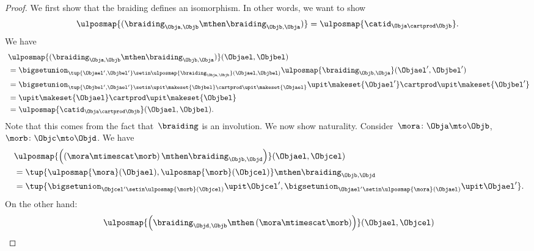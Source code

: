 \begin{proof}
    We first show that the braiding defines an isomorphism.
    In other words, we want to show
    \begin{equation}
        \ulposmap{(\braiding_{\Obja,\Objb}\mthen \braiding_{\Objb,\Obja})}=\ulposmap{\catid_{\Obja \cartprod \Objb}}.
    \end{equation}
    We have
    \begin{equation}
        \begin{aligned}
            ~ & \ulposmap{(\braiding_{\Obja,\Objb}\mthen \braiding_{\Objb,\Obja})}(\Objael,\Objbel) \\
              & =\bigsetunion_{\tup{\Objael',\Objbel'}\setin \ulposmap{\braiding_{\Obja,\Objb}}(\Objael,\Objbel)}\ulposmap{\braiding_{\Objb,\Obja}}(\Objael',\Objbel') \\
              & =\bigsetunion_{\tup{\Objbel',\Objael'}\setin \upit\makeset{\Objbel}\cartprod \upit\makeset{\Objael}}\upit\makeset{ \Objael'}\cartprod \upit\makeset{ \Objbel'} \\
              & =\upit\makeset{\Objael} \cartprod \upit\makeset{\Objbel} \\
              & =\ulposmap{\catid_{\Obja\cartprod \Objb}}(\Objael,\Objbel).
        \end{aligned}
    \end{equation}
    Note that this comes from the fact that~$\braiding$ is an involution.
    We now show naturality.
    Consider~$\mora \colon \Obja \mto \Objb$,~$\morb\colon \Objc \mto \Objd$.
    We have
    \begin{equation}
        \label{eq:braid-upos-natural-a}
        \begin{aligned}
            ~ & \ulposmap{\left(\left( \mora \mtimescat \morb\right)\mthen \braiding_{ \Objb, \Objd}\right)}(\Objael,\Objcel) \\
              & = \tup{\ulposmap{\mora}(\Objael),\ulposmap{\morb}(\Objcel)}\mthen \braiding_{ \Objb, \Objd} \\
              & =\tup{\bigsetunion_{\Objcel'\setin \ulposmap{\morb}(\Objcel)}\upit \Objcel',\bigsetunion_{\Objael'\setin \ulposmap{\mora}(\Objael)}\upit \Objael'}.
        \end{aligned}
    \end{equation}
    On the other hand:
    \begin{equation}
        \label{eq:braid-upos-natural-b}
        \begin{aligned}
            ~ & \ulposmap{\left(\braiding_{ \Objd, \Objb}\mthen \left( \mora \mtimescat \morb\right)\right)}(\Objael,\Objcel) \\

\end{aligned}
\end{equation}
\end{proof}
